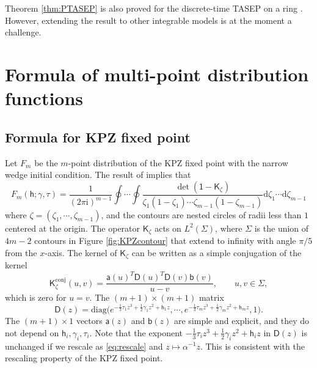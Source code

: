 \documentclass[10pt]{article}
\theoremstyle{plain}
\theoremstyle{definition}
\newcommand{\beq}{ \begin{equation} }
\newcommand{\eeq}{ \end{equation} }
\newcommand{\beqq}{ \begin{equation*} }
\newcommand{\eeqq}{ \end{equation*} }
\newcommand{\dd}{\mathrm{d}}
\newcommand{\ii}{\mathrm{i}}
\newcommand{\Z}{\mathbb{Z}}
\newcommand{\kmath}{\mathsf}  %
\newcommand{\kFdist}{F} %
\newcommand{\kt}{\tau} %
\newcommand{\kga}{\gamma} %
\newcommand{\kh}{\kmath{h}}  %
\newcommand{\kid}{\kmath{1}}  %
\newcommand{\kK}{\kmath{K}}  %
\newcommand{\ku}{u}  %
\newcommand{\kv}{v}  %
\newcommand{\ka}{\kmath{a}}  %
\newcommand{\kb}{\kmath{b}}  %
\newcommand{\kD}{\kmath{D}}  %
\newcommand{\diag}{\mathrm{diag}}  %
\numberwithin{equation}{section}
\begin{document}


Theorem \ref{thm:PTASEP} is also proved for the discrete-time TASEP on a ring \cite{Liao21}. 
However,  extending the result to other integrable models is at the moment a challenge. 


\section{Formula of multi-point distribution functions} \label{sec:dfformula}

\subsection{Formula for KPZ fixed point}

Let $\kFdist_m$ be the $m$-point distribution of the KPZ fixed point with the narrow wedge initial condition. The result of  \cite{Liu19} implies that  
\beq \label{eq:KPZformula}
	\kFdist_m(\kh; \kga, \kt) 
	= \frac1{(2\pi \ii)^{m-1}} \oint \cdots \oint  \frac{\det( \kid- \kK_\zeta)}{\zeta_1(1-\zeta_1) \cdots \zeta_{m-1} (1-\zeta_{m-1})} \dd \zeta_1 \cdots \dd \zeta_{m-1}
\eeq
where $\zeta=(\zeta_1, \cdots, \zeta_{m-1})$, and the contours are nested circles of radii less than $1$ centered at the origin. 
The operator $\kK_\zeta$ acts on $L^2(\Sigma)$, where 
$\Sigma$ is the union of $4m-2$ contours in Figure \ref{fig:KPZcontour} that extend to infinity with angle $\pi/5$ from the $x$-axis.
The kernel of $\kK_\zeta$ can be written \cite{Baik-Prokhorov-Silva21}  as a simple conjugation of the kernel 
\beq \label{eq:kpzKkernel}
	\kK^{\mathrm{conj}}_\zeta(\ku, \kv) = \frac{\ka(\ku)^T \kD(\ku)^T \kD(\kv) \kb( \kv)}{\ku-\kv}, \qquad \ku, \kv\in \Sigma, 
\eeq
which is zero for $\ku=\kv$. 
The $(m+1)\times (m+1)$ matrix 
\beqq
	\kD(z)= \diag\big( e^{- \frac{1}{3} \kt_1 z^3+ \frac{1}{2} \kga_1 z^2 + \kh_1 z}, \cdots, e^{- \frac{1}{3} \kt_m z^3 + \frac{1}{2} \kga_m z^2 + \kh_m z}, 1 \big) . 
\eeqq
The $(m+1)\times 1$ vectors $\ka(z)$ and $\kb(z)$ are simple and explicit, and they do not depend on $\kh_i, \kga_i, \kt_i$. 
Note that the exponent $- \frac{1}{3} \kt_i z^3+ \frac{1}{2} \kga_i z^2+ \kh_i z$ in $\kD(z)$ is unchanged if we rescale as \eqref{eq:rescale} and $z\mapsto \alpha^{-1} z$. 
This is consistent with the rescaling property of the KPZ fixed point. 
\end{document}
